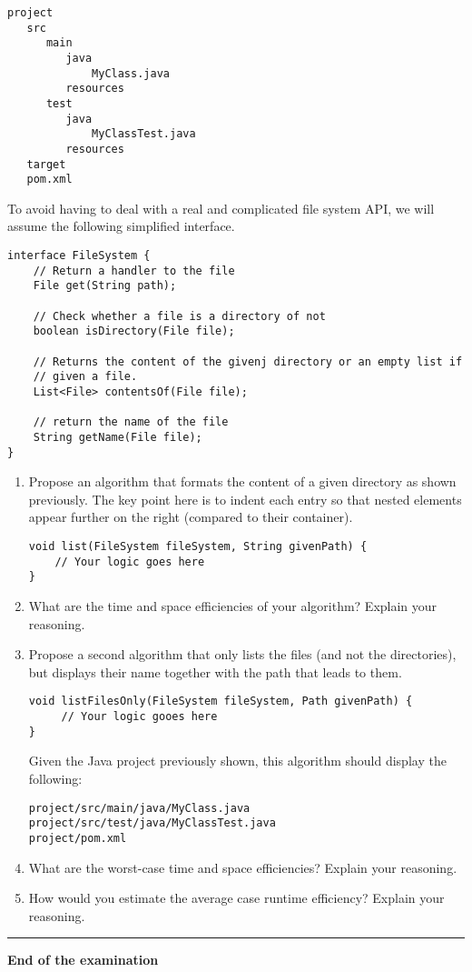 \documentclass[11pt]{article}
\begin{document}
\begin{verbatim}
project
   src
      main
         java
             MyClass.java 
         resources
      test
         java
             MyClassTest.java
         resources
   target
   pom.xml
\end{verbatim}

To avoid having to deal with a real and complicated file system API, we will assume
the following simplified interface. 

\begin{verbatim}
interface FileSystem {
    // Return a handler to the file
    File get(String path);

    // Check whether a file is a directory of not
    boolean isDirectory(File file);

    // Returns the content of the givenj directory or an empty list if
    // given a file.
    List<File> contentsOf(File file);

    // return the name of the file
    String getName(File file);
}
\end{verbatim}

\begin{enumerate}
\item Propose an algorithm that formats the content of a given directory as
shown previously. The key point here is to indent each entry so
that nested elements appear further on the right (compared to
their container).

\begin{verbatim}
void list(FileSystem fileSystem, String givenPath) {
    // Your logic goes here
}
\end{verbatim}

\item What are the time and space efficiencies of your
algorithm? Explain your reasoning.

\item Propose a second algorithm that only lists the files (and not the
directories), but displays their name together with the path
that leads to them.

\begin{verbatim}
void listFilesOnly(FileSystem fileSystem, Path givenPath) {
     // Your logic gooes here
}
\end{verbatim}

Given the Java project previously shown, this algorithm should
display the following:

\begin{verbatim}
project/src/main/java/MyClass.java
project/src/test/java/MyClassTest.java
project/pom.xml
\end{verbatim}

\item What are the worst-case time and space efficiencies? Explain your
reasoning.

\item How would you estimate the average case runtime efficiency?
Explain your reasoning.
\end{enumerate}

\noindent\rule{\textwidth}{0.5pt}
\textbf{End of the examination}
\end{document}

